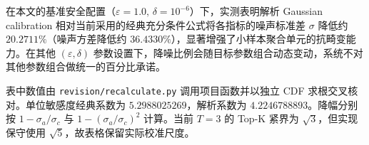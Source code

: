 在本文的基准安全配置（$\varepsilon = 1.0, \, \delta = 10^{-6}$）下，实测表明解析 Gaussian calibration 相对当前采用的经典充分条件公式将各指标的噪声标准差 $\sigma$ 降低约 $20.2711\%$（噪声方差降低约 $36.4330\%$），显著增强了小样本聚合单元的抗畸变能力。在其他 $(\varepsilon, \delta)$ 参数设置下，降噪比例会随目标参数组合动态变动，系统不对其他参数组合做统一的百分比承诺。

表中数值由 \texttt{revision/recalculate.py} 调用项目函数并以独立 CDF 求根交叉核对。单位敏感度经典系数为 $5.2988025269$，解析系数为 $4.2246788893$。降幅分别按 $1-\sigma_a/\sigma_c$ 与 $1-(\sigma_a/\sigma_c)^2$ 计算。当前 $T=3$ 的 Top-K 紧界为 $\sqrt3$，但实现保守使用 $\sqrt5$，故表格保留实际校准尺度。
